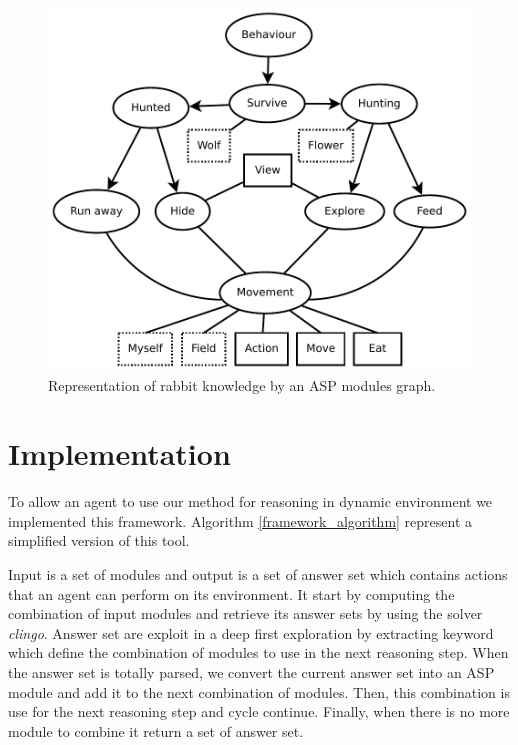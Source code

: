 \documentclass{aamas2012}
\begin{document}
	\begin{figure}
		\centering
		\includegraphics[keepaspectratio=true, scale=0.5]{modular_knowledge.pdf}
		\caption
		{
			\label{modular_knowledge}
			Representation of rabbit knowledge by an ASP modules graph.
		}
	\end{figure}
	
\section{Implementation}

	To allow an agent to use our method for reasoning in dynamic environment we implemented this framework.
	Algorithm \ref{framework_algorithm} represent a simplified version of this tool.
	
	Input is a set of modules and output is a set of answer set which contains actions that an agent can perform on its environment.
	It start by computing the combination of input modules and retrieve its answer sets by using the solver \emph{clingo}.
	Answer set are exploit in a deep first exploration by extracting keyword which define the combination of modules to use in the next reasoning step.
	When the answer set is totally parsed, we convert the current answer set into an ASP module and add it to the next combination of modules.
	Then, this combination is use for the next reasoning step and cycle continue.
	Finally, when there is no more module to combine it return a set of answer set.
\end{document}
